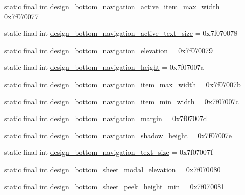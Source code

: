 \begin{CompactItemize}
\item 
static final int \hyperlink{classandroid_1_1support_1_1v7_1_1recyclerview_1_1_r_1_1dimen_6b7676564341d89b548802c079fee030}{design\_\-bottom\_\-navigation\_\-active\_\-item\_\-max\_\-width} = 0x7f070077
\item 
static final int \hyperlink{classandroid_1_1support_1_1v7_1_1recyclerview_1_1_r_1_1dimen_ab2f358c363453797504ceb3b74e2291}{design\_\-bottom\_\-navigation\_\-active\_\-text\_\-size} = 0x7f070078
\item 
static final int \hyperlink{classandroid_1_1support_1_1v7_1_1recyclerview_1_1_r_1_1dimen_a0f7594d3d27e005d08bdbe2bb2b6a65}{design\_\-bottom\_\-navigation\_\-elevation} = 0x7f070079
\item 
static final int \hyperlink{classandroid_1_1support_1_1v7_1_1recyclerview_1_1_r_1_1dimen_fc140ff9f20f51dccc90fb68025f4ff8}{design\_\-bottom\_\-navigation\_\-height} = 0x7f07007a
\item 
static final int \hyperlink{classandroid_1_1support_1_1v7_1_1recyclerview_1_1_r_1_1dimen_7b850be1623e3979ecb4b59eb8e0c6c9}{design\_\-bottom\_\-navigation\_\-item\_\-max\_\-width} = 0x7f07007b
\item 
static final int \hyperlink{classandroid_1_1support_1_1v7_1_1recyclerview_1_1_r_1_1dimen_af8a9a20fd7d12d540876d23435069c6}{design\_\-bottom\_\-navigation\_\-item\_\-min\_\-width} = 0x7f07007c
\item 
static final int \hyperlink{classandroid_1_1support_1_1v7_1_1recyclerview_1_1_r_1_1dimen_dc28eb0af6f932c910f3dba8fb6f7f85}{design\_\-bottom\_\-navigation\_\-margin} = 0x7f07007d
\item 
static final int \hyperlink{classandroid_1_1support_1_1v7_1_1recyclerview_1_1_r_1_1dimen_3b41bbe12263e09776d95d03ed50bedb}{design\_\-bottom\_\-navigation\_\-shadow\_\-height} = 0x7f07007e
\item 
static final int \hyperlink{classandroid_1_1support_1_1v7_1_1recyclerview_1_1_r_1_1dimen_ddf091596807640a57299bcbac916016}{design\_\-bottom\_\-navigation\_\-text\_\-size} = 0x7f07007f
\item 
static final int \hyperlink{classandroid_1_1support_1_1v7_1_1recyclerview_1_1_r_1_1dimen_5043d63e392ce9db218dfa5c8bd4ce39}{design\_\-bottom\_\-sheet\_\-modal\_\-elevation} = 0x7f070080
\item 
static final int \hyperlink{classandroid_1_1support_1_1v7_1_1recyclerview_1_1_r_1_1dimen_36beccf0850acd436d0f6d1ba1d45ee8}{design\_\-bottom\_\-sheet\_\-peek\_\-height\_\-min} = 0x7f070081
\item 

\end{CompactItemize}
